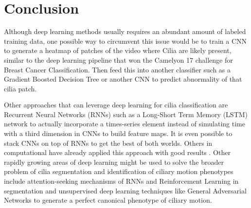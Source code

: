 \section{Conclusion}

Although deep learning methods usually requires an abundant amount of labeled training data, one possible way to circumvent this issue would be to train a CNN to generate a heatmap of patches of the video where Cilia are likely present, similar to the deep learning pipeline that won the Camelyon 17 challenge for Breast Cancer Classification\cite{wang2016deep}. Then feed this into another classifier such as a Gradient Boosted Decision Tree or another CNN to predict abnormality of that cilia patch.
 
Other approaches that can leverage deep learning for cilia classification are Recurrent Neural Networks (RNNs) such as a Long-Short Term Memory (LSTM) network to actually incorporate a times-series element instead of simulating time with a third dimension in CNNs to build feature maps. It is even possible to stack CNNs on top of RNNs to get the best of both worlds. Others in computational have already applied this approach with good results \cite{sonderby2015convolutional}. Other rapidly growing areas of deep learning might be used to solve the broader problem of cilia segmentation and identification of ciliary motion phenotypes include attention-seeking mechanisms of RNNs and Reinforcement Learning in segmentation and  unsupervised deep learning techniques like General Adversarial Networks to generate a perfect canonical phenotype of ciliary motion.

